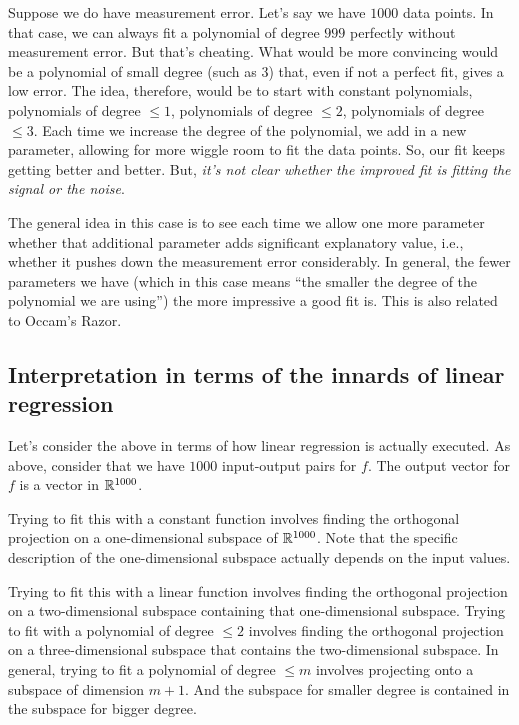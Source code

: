 \documentclass[10pt]{amsart}
\begin{document}
Suppose we do have measurement error. Let's say we have $1000$ data
points. In that case, we can always fit a polynomial of degree $999$
perfectly without measurement error. But that's cheating. What would
be more convincing would be a polynomial of small degree (such as $3$)
that, even if not a perfect fit, gives a low error. The idea,
therefore, would be to start with constant polynomials, polynomials of
degree $\le 1$, polynomials of degree $\le 2$, polynomials of degree
$\le 3$. Each time we increase the degree of the polynomial, we add in
a new parameter, allowing for more wiggle room to fit the data
points. So, our fit keeps getting better and better. But, {\em it's
  not clear whether the improved fit is fitting the signal or the
  noise}.

The general idea in this case is to see each time we allow one more
parameter whether that additional parameter adds significant
explanatory value, i.e., whether it pushes down the measurement error
considerably. In general, the fewer parameters we have (which in this
case means ``the smaller the degree of the polynomial we are using'')
the more impressive a good fit is. This is also related to Occam's
Razor.

\subsection{Interpretation in terms of the innards of linear regression}

Let's consider the above in terms of how linear regression is actually
executed. As above, consider that we have $1000$ input-output pairs
for $f$. The output vector for $f$ is a vector in $\mathbb{R}^{1000}$.

Trying to fit this with a constant function involves finding the
orthogonal projection on a one-dimensional subspace of
$\mathbb{R}^{1000}$. Note that the specific description of the one-dimensional
subspace actually depends on the input values.

Trying to fit this with a linear function involves finding the
orthogonal projection on a two-dimensional subspace containing that
one-dimensional subspace. Trying to fit with a polynomial of degree
$\le 2$ involves finding the orthogonal projection on a
three-dimensional subspace that contains the two-dimensional
subspace. In general, trying to fit a polynomial of degree $\le m$
involves projecting onto a subspace of dimension $m + 1$. And the
subspace for smaller degree is contained in the subspace for bigger
degree.
\end{document}
